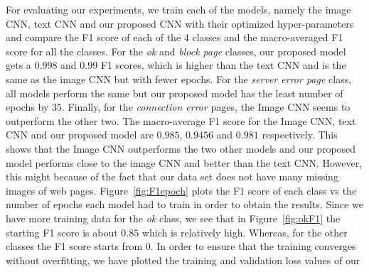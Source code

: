 \documentclass{article} %
\begin{document}
For evaluating our experiments, we train each of the models, namely the image CNN, text CNN and our proposed CNN with their optimized hyper-parameters and compare the F1 score of each of the 4 classes and the macro-averaged F1 score for all the classes. For the \textit{ok} and \textit{block page} classes, our proposed model gets a $0.998$ and $0.99$ F1 scores, which is higher than the text CNN and is the same as the image CNN but with fewer epochs. For the \textit{server error page} class, all models perform the same but our proposed model has the least number of epochs by $35$. Finally, for the \textit{connection error} pages, the Image CNN seems to outperform the other two. The macro-average F1 score for the Image CNN, text CNN and our proposed model are $0.985$, $0.9456$ and $0.981$ respectively. This shows that the Image CNN outperforms the two other models and our proposed model performs close to the image CNN and better than the text CNN. However, this might because of the fact that our data set does not have many missing images of web pages.
Figure~\ref{fig:F1epoch} plots the F1 score of each class vs the number of epochs each model had to train in order to obtain the results. Since we have more training data for the \textit{ok} class, we see that in Figure~\ref{fig:okF1} the starting F1 score is about $0.85$ which is relatively high. Whereas, for the other classes the F1 score starts from $0$.
In order to ensure that the training converges without overfitting, we have plotted the training and validation loss values of our 
   
\end{document}
